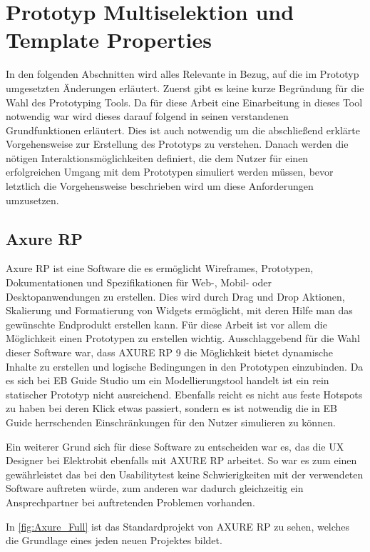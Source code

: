 \section {Prototyp Multiselektion und Template Properties}
In den folgenden Abschnitten wird alles Relevante in Bezug, auf die im Prototyp umgesetzten Änderungen erläutert.
Zuerst gibt es keine kurze Begründung für die Wahl des Prototyping Tools.
Da für diese Arbeit eine Einarbeitung in dieses Tool notwendig war wird dieses darauf folgend in seinen verstandenen Grundfunktionen erläutert.
Dies ist auch notwendig um die abschließend erklärte Vorgehensweise zur Erstellung des Prototyps zu verstehen.
Danach werden die nötigen Interaktionsmöglichkeiten definiert, die dem Nutzer für einen erfolgreichen Umgang mit dem Prototypen simuliert werden müssen, bevor letztlich die Vorgehensweise beschrieben wird um diese Anforderungen umzusetzen.

\subsection {Axure RP}
Axure RP ist eine Software die es ermöglicht Wireframes, Prototypen, Dokumentationen und Spezifikationen für Web-, Mobil- oder Desktopanwendungen zu erstellen.
Dies wird durch Drag und Drop Aktionen, Skalierung und Formatierung von Widgets ermöglicht, mit deren Hilfe man das gewünschte Endprodukt erstellen kann.
Für diese Arbeit ist vor allem die Möglichkeit einen Prototypen zu erstellen wichtig.
Ausschlaggebend für die Wahl dieser Software war, dass AXURE RP 9 die Möglichkeit bietet dynamische Inhalte zu erstellen und logische Bedingungen in den Prototypen einzubinden.
Da es sich bei EB Guide Studio um ein Modellierungstool handelt ist ein rein statischer Prototyp nicht ausreichend.
Ebenfalls reicht es nicht aus feste Hotspots zu haben bei deren Klick etwas passiert, sondern es ist notwendig die in EB Guide herrschenden Einschränkungen für den Nutzer simulieren zu können.

Ein weiterer Grund sich für diese Software zu entscheiden war es, das die UX Designer bei Elektrobit ebenfalls mit AXURE RP arbeitet.
So war es zum einen gewährleistet das bei den Usabilitytest keine Schwierigkeiten mit der verwendeten Software auftreten würde, zum anderen war dadurch gleichzeitig ein Ansprechpartner bei auftretenden Problemen vorhanden.

In \cref{fig:Axure_Full} ist das Standardprojekt von AXURE RP zu sehen, welches die Grundlage eines jeden neuen Projektes bildet.

